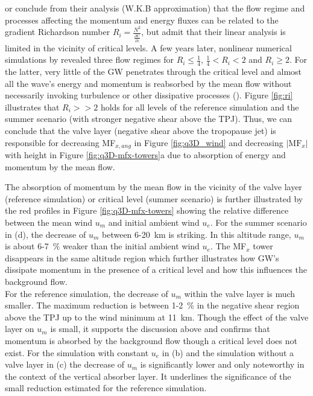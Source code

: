 \textcite[]{bretherton_propagation_1966} or \textcite[]{booker_critical_1967} conclude from their analysis (W.K.B approximation) that the flow regime and processes affecting the momentum and energy fluxes can be related to the gradient Richardson number $R_i=\frac{N^2}{\frac{\partial U}{\partial z}}$, but admit that their linear analysis is limited in the vicinity of critical levels. A few years later, nonlinear numerical simulations by \textcite[]{breeding_non-linear_1971} revealed three flow regimes for $R_i \leq \frac{1}{4}$, $\frac{1}{4} < R_i < 2$ and $R_i \geq 2$. For the latter, very little of the GW penetrates through the critical level and almost all the wave's energy and momentum is reabsorbed by the mean flow without necessarily invoking turbulence or other dissipative processes (\cite[]{booker_critical_1967}). Figure \ref{fig:ri} illustrates that $R_i >> 2$ holds for all levels of the reference simulation and the summer scenario (with stronger negative shear above the TPJ). Thus, we can conclude that the valve layer (negative shear above the tropopause jet) is responsible for decreasing MF$_{x,ang}$ in Figure \ref{fig:q3D_wind} and decreasing $\lvert \mathrm{MF}_x \rvert$ with height in Figure \ref{fig:q3D-mfx-towers}a due to absorption of energy and momentum by the mean flow.

The absorption of momentum by the mean flow in the vicinity of the valve layer (reference simulation) or critical level (summer scenario) is further illustrated by the red profiles in Figure \ref{fig:q3D-mfx-towers} showing the relative difference between the mean wind $u_m$ and initial ambient wind $u_e$. For the summer scenario in (d), the decrease of $u_m$ between 6-\SI{20}{\kilo\meter} is striking. In this altitude range, $u_m$ is about 6-\SI{7}{\percent} weaker than the initial ambient wind $u_e$. The MF$_x$ tower disappears in the same altitude region which further illustrates how GW's dissipate momentum in the presence of a critical level and how this influences the background flow.\\
For the reference simulation, the decrease of $u_m$ within the valve layer is much smaller. The maximum reduction is between 1-\SI{2}{\percent} in the negative shear region above the TPJ up to the wind minimum at \SI{11}{\kilo\meter}. Though the effect of the valve layer on $u_m$ is small, it supports the discussion above and confirms that momentum is absorbed by the background flow though a critical level does not exist. For the simulation with constant $u_e$ in (b) and the simulation without a valve layer in (c) the decrease of $u_m$ is significantly lower and only noteworthy in the context of the vertical absorber layer. It underlines the significance of the small reduction estimated for the reference simulation.

